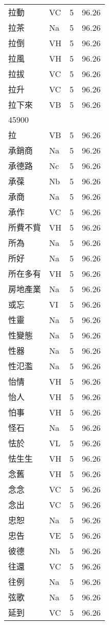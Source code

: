 \documentclass[twocolumn]{book}
\begin{document}
\begin{supertabular}{llrr}
拉動 & VC & 5 &  96.26\\
拉茶 & Na & 5 &  96.26\\
拉倒 & VH & 5 &  96.26\\
拉風 & VH & 5 &  96.26\\
拉拔 & VC & 5 &  96.26\\
拉升 & VC & 5 &  96.26\\
拉下來 & VB & 5 &  96.26\\
45900\\
拉 & VB & 5 &  96.26\\
承銷商 & Na & 5 &  96.26\\
承德路 & Nc & 5 &  96.26\\
承葆 & Nb & 5 &  96.26\\
承商 & Na & 5 &  96.26\\
承作 & VC & 5 &  96.26\\
所費不貲 & VH & 5 &  96.26\\
所為 & Na & 5 &  96.26\\
所好 & Na & 5 &  96.26\\
所在多有 & VH & 5 &  96.26\\
房地產業 & Na & 5 &  96.26\\
或忘 & VI & 5 &  96.26\\
性靈 & Na & 5 &  96.26\\
性變態 & Na & 5 &  96.26\\
性器 & Na & 5 &  96.26\\
性氾濫 & Na & 5 &  96.26\\
怡情 & VH & 5 &  96.26\\
怡人 & VH & 5 &  96.26\\
怕事 & VH & 5 &  96.26\\
怪石 & Na & 5 &  96.26\\
怯於 & VL & 5 &  96.26\\
怯生生 & VH & 5 &  96.26\\
念舊 & VH & 5 &  96.26\\
念念 & VC & 5 &  96.26\\
念出 & VC & 5 &  96.26\\
忠恕 & Na & 5 &  96.26\\
忠告 & VE & 5 &  96.26\\
彼德 & Nb & 5 &  96.26\\
往還 & VC & 5 &  96.26\\
往例 & Na & 5 &  96.26\\
弦歌 & Na & 5 &  96.26\\
延到 & VC & 5 &  96.26\\

\end{supertabular}
\end{document}
